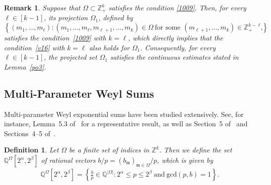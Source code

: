 \documentclass[10pt,a4paper]{amsart}
\newtheorem{definition}{Definition}\numberwithin{definition}{section}
\newtheorem{remark}{Remark}\numberwithin{remark}{section}
\numberwithin{equation}{section}
\begin{document}
 
 
 
 \begin{remark}\label{re3.1}
Suppose that 	$\Omega\subset\mathbb{Z}_+^{k}$ satisfies the condition \eqref{1009}. Then, for every $\ell\in [k-1]$, its projection $\Omega_1$, defined by
	$$
	\left\{
	(m_1,\ldots,m_\ell):
	(m_1,\ldots,m_\ell,m_{\ell+1},\ldots,m_{k})
	\in\Omega \ \text{for some $(m_{\ell+1},\ldots,m_{k})\in \mathbb{Z}_{+}^{k-\ell}$}
	\right\},
	$$
	  satisfies the condition~\eqref{1009} with $k=\ell$, which directly implies that the condition~\eqref{v16} with $k=\ell$ also holds for $\Omega_1$. Consequently, for every $\ell\in[k-1]$, the projected set $\Omega_1$ satisfies the continuous estimates stated in Lemma~\ref{po3}.
\end{remark}













\subsection{Multi-Parameter Weyl Sums}
 Multi-parameter Weyl exponential sums have been studied extensively. See, for instance, Lemma~5.3 of~\cite{ACK} for a representative result, as well as Section~5 of~\cite{B4} and Sections~4--5 of~\cite{KS}.
 
 
 
 


\begin{definition}\label{df23}
	Let $\Omega$ be a finite set of indices in $\mathbb{Z}^{k}$.
	Then we  define  the set  $\mathbb{Q}^{\Omega}[2^{\alpha},2^{\beta}]$
	of  rational vectors  $b/p=(b_\mathfrak{m})_{\mathfrak{m}\in \Omega} /p$,  which is given by
	\begin{align*} 
		\ \ \mathbb{Q}^{\Omega}[2^{\alpha},2^{\beta}]=  \left\{\frac{b}{p}\in   \mathbb{Q}^{|\Omega|}: 2^{\alpha}\le p \le 2^{\beta}\ \text{and}\  \text{gcd}(p,b)=1\right\}.
	\end{align*}
\end{definition}
\end{document}
